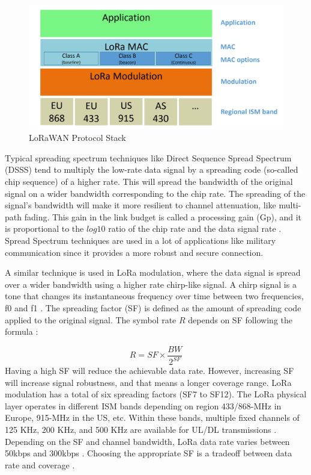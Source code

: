 \documentclass[]{IEEEtran}
\begin{document}
\begin{figure}
    \centering
        \includegraphics[width=\linewidth]{Pictures/LoRaWAN_stack.png}
    \caption{LoRaWAN Protocol Stack}
    \label{fig:LoRaWAN-stack}
\end{figure}



Typical spreading spectrum techniques like Direct Sequence Spread Spectrum (DSSS) tend to multiply the low-rate data signal by a spreading code (so-called chip sequence) of a higher rate. This will spread the bandwidth of the original signal on a wider bandwidth corresponding to the chip rate. The spreading of the signal's bandwidth will make it more resilient to channel attenuation, like multi-path fading. This gain in the link budget is called a processing gain (Gp), and it is proportional to the $log10$ ratio of the chip rate and the data signal rate \cite{LoRaWAN_semtech}.  Spread Spectrum techniques are used in a lot of applications like military communication since it provides a more robust and secure connection.

A similar technique is used in LoRa modulation, where the data signal is spread over a wider bandwidth using a higher rate chirp-like signal. A chirp signal is a tone that changes its instantaneous frequency over time between two frequencies, f0 and f1 \cite{haxhibeqiri2018survey}. The spreading factor (SF) is defined as the amount of spreading code applied to the original signal. The symbol rate $R$ depends on SF following the formula \cite{vangelista2017frequency}:

\begin{equation}
R=SF\times \frac{BW}{2^{SF}}
\label{equ:SF-Rate}
\end{equation}
Having a high SF will reduce the achievable data rate. However, increasing SF will increase signal robustness, and that means a longer coverage range. LoRa modulation has a total of six spreading factors (SF7 to SF12). The LoRa physical layer operates in different ISM bands depending on region 433/868-MHz in Europe, 915-MHz in the US, etc. Within these bands, multiple fixed channels of  125 KHz, 200 KHz, and 500 KHz are available for UL/DL transmissions \cite{adelantado2017understanding}. Depending on the SF and channel bandwidth, LoRa data rate varies between 50kbps and 300kbps \cite{LoRaWAN_spec}. Choosing the appropriate SF is a tradeoff between data rate and coverage \cite{boisguene_survey_2017}.
\end{document}
